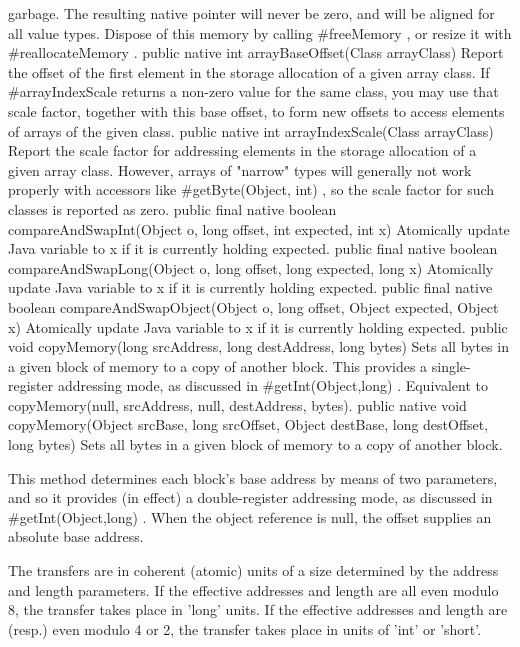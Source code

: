 garbage.  The resulting native pointer will never be zero, and will be
aligned for all value types.  Dispose of this memory by calling #freeMemory , or resize it with #reallocateMemory .
 public native int arrayBaseOffset(Class arrayClass)
Report the offset of the first element in the storage allocation of a
given array class.  If #arrayIndexScale  returns a non-zero value
for the same class, you may use that scale factor, together with this
base offset, to form new offsets to access elements of arrays of the
given class.
 public native int arrayIndexScale(Class arrayClass)
Report the scale factor for addressing elements in the storage
allocation of a given array class.  However, arrays of "narrow" types
will generally not work properly with accessors like #getByte(Object, int) , so the scale factor for such classes is reported
as zero.
 public final native boolean compareAndSwapInt(Object o,
    long offset,
    int expected,
    int x)
Atomically update Java variable to x if it is currently
holding expected.
 public final native boolean compareAndSwapLong(Object o,
    long offset,
    long expected,
    long x)
Atomically update Java variable to x if it is currently
holding expected.
 public final native boolean compareAndSwapObject(Object o,
    long offset,
    Object expected,
    Object x)
Atomically update Java variable to x if it is currently
holding expected.
 public  void copyMemory(long srcAddress,
    long destAddress,
    long bytes) 
Sets all bytes in a given block of memory to a copy of another block. This provides a single-register addressing mode, as discussed in #getInt(Object,long) . Equivalent to copyMemory(null, srcAddress, null, destAddress, bytes).
 public native  void copyMemory(Object srcBase,
    long srcOffset,
    Object destBase,
    long destOffset,
    long bytes)
Sets all bytes in a given block of memory to a copy of another
block.

This method determines each block's base address by means of two parameters,
and so it provides (in effect) a double-register addressing mode,
as discussed in #getInt(Object,long) .  When the object reference is null,
the offset supplies an absolute base address.


The transfers are in coherent (atomic) units of a size determined
by the address and length parameters.  If the effective addresses and
length are all even modulo 8, the transfer takes place in 'long' units.
If the effective addresses and length are (resp.) even modulo 4 or 2,
the transfer takes place in units of 'int' or 'short'.

